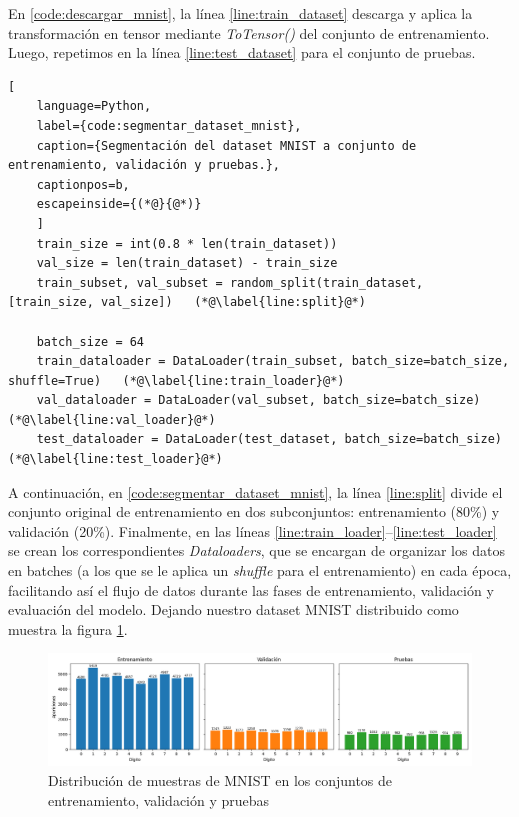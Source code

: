 En \ref{code:descargar_mnist}, la línea \ref{line:train_dataset} descarga y aplica la transformación en tensor mediante \emph{ToTensor()} del conjunto de entrenamiento. Luego, repetimos en la línea \ref{line:test_dataset} para el conjunto de pruebas.

\begin{lstlisting}[
	language=Python,
	label={code:segmentar_dataset_mnist},
	caption={Segmentación del dataset MNIST a conjunto de entrenamiento, validación y pruebas.},
	captionpos=b,
	escapeinside={(*@}{@*)}
	]
	train_size = int(0.8 * len(train_dataset))
	val_size = len(train_dataset) - train_size
	train_subset, val_subset = random_split(train_dataset, [train_size, val_size])   (*@\label{line:split}@*)

	batch_size = 64
	train_dataloader = DataLoader(train_subset, batch_size=batch_size, shuffle=True)   (*@\label{line:train_loader}@*)
	val_dataloader = DataLoader(val_subset, batch_size=batch_size)   (*@\label{line:val_loader}@*)
	test_dataloader = DataLoader(test_dataset, batch_size=batch_size)   (*@\label{line:test_loader}@*)
\end{lstlisting}

A continuación, en \ref{code:segmentar_dataset_mnist}, la línea \ref{line:split} divide el conjunto original de entrenamiento en dos subconjuntos: entrenamiento (80\%) y validación (20\%). Finalmente, en las líneas \ref{line:train_loader}–\ref{line:test_loader} se crean los correspondientes \emph{Dataloaders}, que se encargan de organizar los datos en batches (a los que se le aplica un \emph{shuffle} para el entrenamiento) en cada época, facilitando así el flujo de datos durante las fases de entrenamiento, validación y evaluación del modelo. Dejando nuestro dataset MNIST distribuido como muestra la figura \ref{fig:mnist_distribucion_datasets}.

\begin{figure}[h]
	\centering
	\includegraphics[width=\linewidth]{figures/ejemplos/mnist_distribution_datasets.png}
	\caption{Distribución de muestras de MNIST en los conjuntos de entrenamiento, validación y pruebas}
	\label{fig:mnist_distribucion_datasets}
\end{figure}

